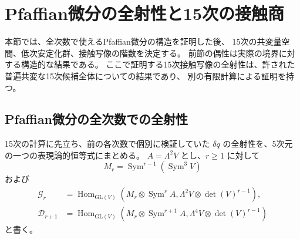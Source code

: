 \clearpage
\section{Pfaffian微分の全射性と15次の接触商}
\label{sec:contact-fifteen}

本節では、全次数で使えるPfaffian微分の構造を証明した後、
15次の共変量空間、低次安定化群、接触写像の階数を決定する。
前節の偶性は実際の境界に対する構造的な結果である。
ここで証明する15次接触写像の全射性は、許された普遍共変な15次候補全体についての結果であり、
別の有限計算による証明を持つ。

\subsection{Pfaffian微分の全次数での全射性}
\label{subsec:v12-uniform-pfaffian}

15次の計算に先立ち、前の各次数で個別に検証していた
$\delta q$ の全射性を、5次元の一つの表現論的恒等式にまとめる。
$A=\Lambda^2V$ とし、$r\ge1$ に対して
\[
 M_r=\operatorname{Sym}^{r-1}(\operatorname{Sym}^3V)
\]
および
\begin{align*}
 \mathcal G_r&=\operatorname{Hom}_{\mathrm{GL}(V)}
 \left(M_r\otimes\operatorname{Sym}^r A,
        \Lambda^2V\otimes\det(V)^{r-1}\right),\\
 \mathcal D_{r+1}&=\operatorname{Hom}_{\mathrm{GL}(V)}
 \left(M_r\otimes\operatorname{Sym}^{r+1} A,
        \Lambda^4V\otimes\det(V)^{r-1}\right)
\end{align*}
と書く。

